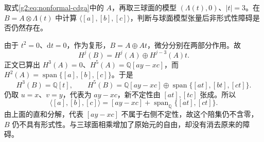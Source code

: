 \begin{exercise}\label{g2:ex:massey-product-with-sphere}
	取式\eqref{g2:eq:nonformal-cdga}中的 \(A\)，再取三球面的模型 \((\Lambda(t),0)\)、\(|t|=3\)。在 \(B=A\otimes\Lambda(t)\) 中计算 \(\langle[a],[b],[c]\rangle\)，判断与球面模型张量后非形式性障碍是否仍然存在。
\end{exercise}
\begin{solution}
	由于 \(t^2=0\)、\(\mathrm dt=0\)，作为复形，\(B=A\oplus At\)，微分分别在两部分作用。故
	\[
		H^j(B)=H^j(A)\oplus H^{j-3}(A)t.
	\]
	正文已算出 \(H^3(A)=0\)、\(H^5(A)=\mathbb Q[ay-xc]\)，而 \(H^2(A)=\operatorname{span}\{[a],[b],[c]\}\)。于是
	\[
		H^3(B)=\mathbb Q[t],\qquad
		H^5(B)=\mathbb Q[ay-xc]\oplus\operatorname{span}\{[at],[bt],[ct]\}.
	\]
	仍取 \(u=x\)、\(v=y\)，代表为 \(ay-xc\)，新不定性由 \([at],[tc]\) 张成。所以
	\[
		\langle[a],[b],[c]\rangle
		=[ay-xc]+\operatorname{span}_{\mathbb Q}\{[at],[ct]\}.
	\]
	由上面的直和分解，代表 \([ay-xc]\) 不属于右侧不定性，故这个陪集仍不含零，\(B\) 仍不具有形式性。与三球面相乘增加了原始元的自由，却没有消去原来的障碍。
\end{solution}
